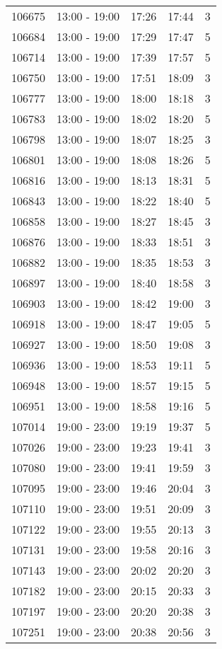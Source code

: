 \documentclass{article}
\begin{document}
\begin{tabular}{llccc}
106675 & 13:00 - 19:00 & 17:26 & 17:44 & 3 \\
106684 & 13:00 - 19:00 & 17:29 & 17:47 & 5 \\
106714 & 13:00 - 19:00 & 17:39 & 17:57 & 5 \\
106750 & 13:00 - 19:00 & 17:51 & 18:09 & 3 \\
106777 & 13:00 - 19:00 & 18:00 & 18:18 & 3 \\
106783 & 13:00 - 19:00 & 18:02 & 18:20 & 5 \\
106798 & 13:00 - 19:00 & 18:07 & 18:25 & 3 \\
106801 & 13:00 - 19:00 & 18:08 & 18:26 & 5 \\
106816 & 13:00 - 19:00 & 18:13 & 18:31 & 5 \\
106843 & 13:00 - 19:00 & 18:22 & 18:40 & 5 \\
106858 & 13:00 - 19:00 & 18:27 & 18:45 & 3 \\
106876 & 13:00 - 19:00 & 18:33 & 18:51 & 3 \\
106882 & 13:00 - 19:00 & 18:35 & 18:53 & 3 \\
106897 & 13:00 - 19:00 & 18:40 & 18:58 & 3 \\
106903 & 13:00 - 19:00 & 18:42 & 19:00 & 3 \\
106918 & 13:00 - 19:00 & 18:47 & 19:05 & 5 \\
106927 & 13:00 - 19:00 & 18:50 & 19:08 & 3 \\
106936 & 13:00 - 19:00 & 18:53 & 19:11 & 5 \\
106948 & 13:00 - 19:00 & 18:57 & 19:15 & 5 \\
106951 & 13:00 - 19:00 & 18:58 & 19:16 & 5 \\
107014 & 19:00 - 23:00 & 19:19 & 19:37 & 5 \\
107026 & 19:00 - 23:00 & 19:23 & 19:41 & 3 \\
107080 & 19:00 - 23:00 & 19:41 & 19:59 & 3 \\
107095 & 19:00 - 23:00 & 19:46 & 20:04 & 3 \\
107110 & 19:00 - 23:00 & 19:51 & 20:09 & 3 \\
107122 & 19:00 - 23:00 & 19:55 & 20:13 & 3 \\
107131 & 19:00 - 23:00 & 19:58 & 20:16 & 3 \\
107143 & 19:00 - 23:00 & 20:02 & 20:20 & 3 \\
107182 & 19:00 - 23:00 & 20:15 & 20:33 & 3 \\
107197 & 19:00 - 23:00 & 20:20 & 20:38 & 3 \\
107251 & 19:00 - 23:00 & 20:38 & 20:56 & 3 \\

\end{tabular}
\end{document}
